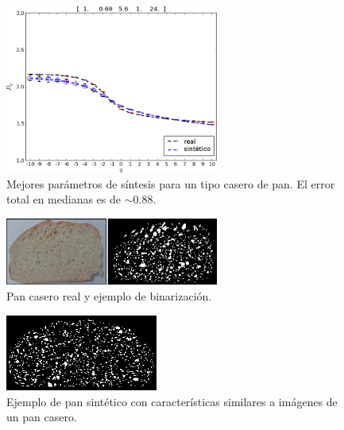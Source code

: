 \documentclass[spanish]{beamer}
\begin{document}
\begin{frame}
\begin{figure}
\includegraphics[width=7cm]{../figures/bestboxplot2}
\caption[Mejores parámetros de síntesis para un tipo casero de pan]{Mejores parámetros de síntesis para un tipo casero de pan. El error total en medianas es de $\sim 0.88$.}
\label{bestboxplot2}
\end{figure}

\end{frame}

\begin{frame}

\begin{figure}
\begin{center}
\includegraphics[width=7cm]{../figures/realbin2}
\caption{ Pan casero real y ejemplo de binarización.}
\label{realbin2}
\end{center}
\end{figure}

\begin{figure}
\begin{center}
\includegraphics[width=5cm]{../figures/best2}
\caption{Ejemplo de pan sintético con características similares a imágenes de un pan casero.}
\label{best2}
\end{center}
\end{figure}
\end{frame}
\end{document}
